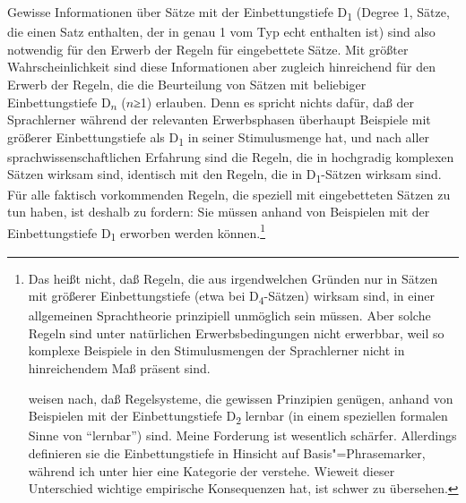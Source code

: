 \documentclass[output=paper]{langsci/langscibook}
\begin{document}
\addlines%
Gewisse Informationen über Sätze mit der Einbettungstiefe D\textsubscript{1} (Degree 1, \dash Sätze, die einen Satz enthalten, der in genau 1  vom Typ  echt enthalten ist) sind also notwendig für den Erwerb der Regeln für eingebettete Sätze. Mit
größter Wahrscheinlichkeit sind diese Informationen aber zugleich hinreichend für
den Erwerb der Regeln, die die Beurteilung von Sätzen mit beliebiger Einbettungstiefe D\textsubscript{$n$} ($n$≥1) erlauben. Denn es spricht nichts dafür, daß der Sprachlerner während
der relevanten Erwerbsphasen überhaupt Beispiele mit größerer Einbettungstiefe als
D\textsubscript{1} in seiner Stimulusmenge hat, und nach aller sprachwissenschaftlichen Erfahrung
sind die Regeln, die in hochgradig komplexen Sätzen wirksam sind, identisch mit
den Regeln, die in D\textsubscript{1}-Sätzen wirksam sind. Für alle faktisch vorkommenden Regeln,
die speziell mit eingebetteten Sätzen zu tun haben, ist deshalb zu fordern: Sie müssen
anhand von Beispielen mit der Einbettungstiefe D\textsubscript{1}
erworben werden können.\footnote{%
	Das heißt nicht, daß Regeln, die aus
  irgendwelchen Gründen nur in Sätzen mit größerer Einbettungstiefe
  (etwa bei D\textsubscript{4}-Sätzen) wirksam sind, in einer allgemeinen
  Sprachtheorie prinzipiell unmöglich sein müssen. Aber solche Regeln
  sind unter natürlichen Erwerbsbedingungen nicht erwerbbar, weil so
  komplexe Beispiele in den Stimulusmengen der Sprachlerner nicht in
  hinreichendem Maß präsent sind.

  \citet{WexlerCulicover1980} weisen nach, daß Regelsysteme, die
  gewissen Prinzipien genügen, anhand von Beispielen mit der
  Einbettungstiefe D\textsubscript{2} lernbar (in einem speziellen
  formalen Sinne von "`lernbar"') sind. Meine Forderung ist wesentlich
  schärfer. Allerdings definieren sie die Einbettungstiefe in Hinsicht
  auf Basis"=Phrasemarker, während ich unter  hier eine
  Kategorie der  verstehe. Wieweit dieser
  Unterschied wichtige empirische Konsequenzen hat, ist schwer zu
  übersehen.%
}
\end{document}
